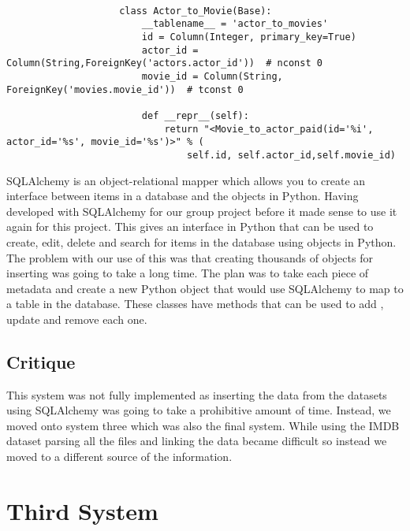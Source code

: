             \begin{minipage}{\linewidth}
                \begin{lstlisting}[gobble=20, tabsize=4,caption=Representing the Actor to Movie class,label=ActorToMovieClass]

                    class Actor_to_Movie(Base):
                        __tablename__ = 'actor_to_movies'
                        id = Column(Integer, primary_key=True)
                        actor_id = Column(String,ForeignKey('actors.actor_id'))  # nconst 0
                        movie_id = Column(String, ForeignKey('movies.movie_id'))  # tconst 0

                        def __repr__(self):
                            return "<Movie_to_actor_paid(id='%i', actor_id='%s', movie_id='%s')>" % (
                                self.id, self.actor_id,self.movie_id)
                \end{lstlisting}
            \end{minipage}


            SQLAlchemy is an object-relational mapper which allows you to create an interface between items in a database and the objects in Python. Having developed with SQLAlchemy for our group project before it made sense to use it again for this project. This gives an interface in Python that can be used to create, edit, delete and search for items in the database using objects in Python. The problem with our use of this was that creating thousands of objects for inserting was going to take a long time. The plan was to take each piece of metadata and create a new Python object that would use SQLAlchemy to map to a table in the database. These classes have methods that can be used to add , update and remove each one. 
            


        \subsection{Critique}
            This system was not fully implemented as inserting the data from the datasets using SQLAlchemy was going to take a prohibitive amount of time. Instead, we moved onto system three which was also the final system. While using the IMDB dataset parsing all the files and linking the data became difficult so instead we moved to a different source of the information. 

        
    \section{Third System}

